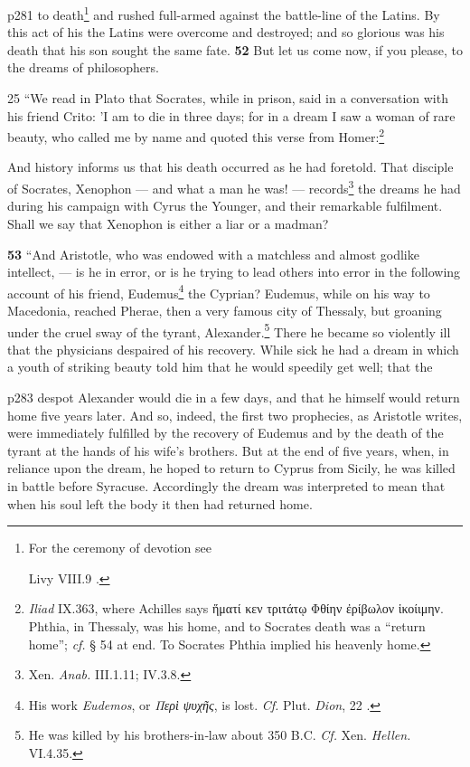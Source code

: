 p281 to death\texthebrew{}\footnote{For the ceremony of devotion see

Livy VIII.9 .

} and rushed full-armed against the battle-line of the Latins. By this act of his the Latins were overcome and destroyed; and so glorious was his death that his son sought the same fate. \textbf{52} But let us come now, if you please, to the dreams of philosophers.

25
``We read in Plato that Socrates, while in prison, said in a conversation with his friend Crito: 'I am to die in three days; for in a dream I saw a woman of rare beauty, who called me by name and quoted this verse from Homer:\footnote{\emph{Iliad} IX.363, where Achilles says \textgreek{\texthebrew{ἥ}ματί κεν τριτάτ\texthebrew{ῳ} Φθίην \texthebrew{ἐ}ρίβωλον \texthebrew{ἱ}κοίιμην}. Phthia, in Thessaly, was his home, and to Socrates death was a ``return home''; \emph{cf.} § 54 at end. To Socrates Phthia implied his heavenly home.

}

And history informs us that his death occurred as he had foretold. That disciple of Socrates, Xenophon \texthebrew{—} and what a man he was! \texthebrew{—} records\texthebrew{}\footnote{Xen. \emph{Anab.} III.1.11; IV.3.8.

} the dreams he had during his campaign with Cyrus the Younger, and their remarkable fulfilment. Shall we say that Xenophon is either a liar or a madman?

\textbf{53} ``And Aristotle, who was endowed with a matchless and almost godlike intellect, \texthebrew{—} is he in error, or is he trying to lead others into error in the following account of his friend, Eudemus\texthebrew{}\footnote{His work \emph{Eudemos}, or \emph{\textgreek{Περ\texthebrew{ὶ} ψυχ\texthebrew{ῆ}ς}}, is lost. \emph{Cf.} Plut. \emph{Dion}, 22 .

} the Cyprian? Eudemus, while on his way to Macedonia, reached Pherae, then a very famous city of Thessaly, but groaning under the cruel sway of the tyrant, Alexander.\texthebrew{}\footnote{He was killed by his brothers-in\texthebrew{‑}law about 350 B.C. \emph{Cf.} Xen. \emph{Hellen.} VI.4.35.

} There he became so violently ill that the physicians despaired of his recovery. While sick he had a dream in which a youth of striking beauty told him that he would speedily get well; that the

p283 despot Alexander would die in a few days, and that he himself would return home five years later. And so, indeed, the first two prophecies, as Aristotle writes, were immediately fulfilled by the recovery of Eudemus and by the death of the tyrant at the hands of his wife's brothers. But at the end of five years, when, in reliance upon the dream, he hoped to return to Cyprus from Sicily, he was killed in battle before Syracuse. Accordingly the dream was interpreted to mean that when his soul left the body it then had returned home.


